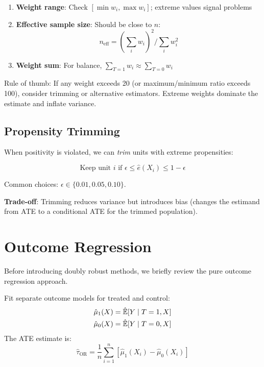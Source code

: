 \begin{definition}
\begin{enumerate}
    \item \textbf{Weight range}: Check $[\min w_i, \max w_i]$; extreme values signal problems
    \item \textbf{Effective sample size}: Should be close to $n$:
    \[n_{\text{eff}} = (\textstyle\sum_i w_i)^2 / \sum_i w_i^2\]
    \item \textbf{Weight sum}: For balance, $\sum_{T=1} w_i \approx \sum_{T=0} w_i$
\end{enumerate}
\end{definition}

\begin{insight}
Rule of thumb: If any weight exceeds 20 (or maximum/minimum ratio exceeds 100), consider trimming or alternative estimators. Extreme weights dominate the estimate and inflate variance.
\end{insight}

\subsection{Propensity Trimming}

When positivity is violated, we can \emph{trim} units with extreme propensities:

\begin{equation}
\text{Keep unit } i \text{ if } \epsilon \leq \hat{e}(X_i) \leq 1 - \epsilon
\end{equation}

Common choices: $\epsilon \in \{0.01, 0.05, 0.10\}$.

\textbf{Trade-off}: Trimming reduces variance but introduces bias (changes the estimand from ATE to a conditional ATE for the trimmed population).

\section{Outcome Regression}
\label{sec:outcome_regression}

Before introducing doubly robust methods, we briefly review the pure outcome regression approach.

\begin{definition}
Fit separate outcome models for treated and control:
\begin{align}
\hat{\mu}_1(X) &= \hat{\mathbb{E}}[Y \mid T=1, X] \\
\hat{\mu}_0(X) &= \hat{\mathbb{E}}[Y \mid T=0, X]
\end{align}
The ATE estimate is:
\begin{equation}
\hat{\tau}_{\text{OR}} = \frac{1}{n}\sum_{i=1}^{n} \left[ \hat{\mu}_1(X_i) - \hat{\mu}_0(X_i) \right]
\end{equation}
\end{definition}

